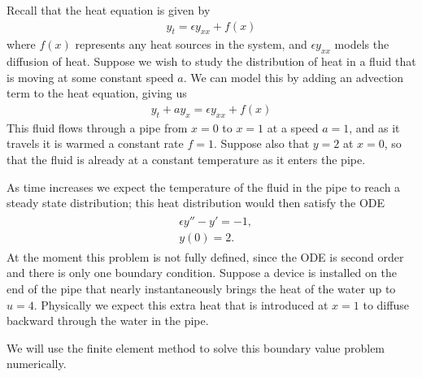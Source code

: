 \label{lab:FEM}
Recall that the heat equation is given by 
\begin{align*}
y_t = \epsilon y_{xx} + f(x) %
\end{align*}
where $f(x)$ represents any heat sources in the system, and $\epsilon y_{xx}$ models the diffusion of heat. Suppose we wish to study the distribution of heat in a fluid that is moving at some constant speed $a$. We can model this by adding an advection term to the heat equation, giving us 
\begin{align*}
y_t + ay_x = \epsilon y_{xx} + f(x) %
\end{align*}
This fluid flows through a pipe from $x = 0$ to $x = 1$ at a speed $a = 1$, and as it travels it is warmed a constant rate $f= 1$.  Suppose also that $y = 2$ at $x = 0$, so that the fluid is already at a constant temperature as it enters the pipe. 


As time increases we expect the temperature of the fluid in the pipe to reach a steady state distribution; this heat distribution would then satisfy the ODE 
\begin{align}
\begin{split}
&{ } \epsilon y'' - y' = -1,\\
&{ } y(0) = 2. 
\end{split}\label{FEM:steady_state}
\end{align}
At the moment this problem is not fully defined, since the ODE is second order and there is only one boundary condition.  Suppose a device is installed on the end of the pipe that nearly instantaneously brings the heat of the water up to $u = 4$.  Physically we expect this extra heat that is introduced at $x = 1$ to diffuse backward through the water in the pipe.



We will use the finite element method to solve this boundary value problem numerically. 
 

